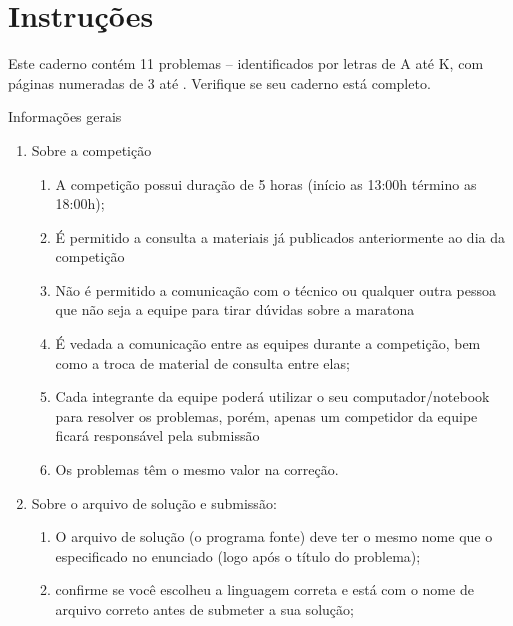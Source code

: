 \section{Instruções}

Este caderno contém 11 problemas – identificados por letras de A até K, com páginas numeradas de 3 até \pageref{LastPage}. Verifique se seu caderno está completo.

Informações gerais

\begin{enumerate}
\item Sobre a competição
\begin{enumerate}
\item A competição possui duração de 5 horas (início as 13:00h término as 18:00h);
\item É permitido a consulta a materiais já publicados anteriormente ao dia da competição
\item Não é permitido a comunicação com o técnico ou qualquer outra pessoa que não seja a equipe para tirar dúvidas sobre a maratona
\item É vedada a comunicação entre as equipes durante a competição, bem como a troca de material de consulta entre elas;
\item Cada integrante da equipe poderá utilizar o seu computador/notebook para resolver os problemas, porém, apenas um competidor da equipe ficará responsável pela submissão
\item Os problemas têm o mesmo valor na correção. 
\end{enumerate}
\item Sobre o arquivo de solução e submissão:
  \begin{enumerate}
  \item O arquivo de solução (o programa fonte) deve ter o mesmo nome que o especificado no enunciado (logo após o título do problema);
  \item confirme se você escolheu a linguagem correta e está com o nome de arquivo correto antes de submeter a sua solução;

\end{enumerate}
\end{enumerate}
